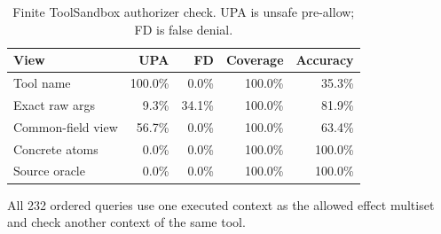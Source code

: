 \begin{table}[t]
\centering
\scriptsize
\setlength{\tabcolsep}{2.5pt}
\caption{Finite ToolSandbox authorizer check. UPA is unsafe pre-allow; FD is false denial.}
\label{tab:concrete-atom-authorizer}
\begin{tabular}{@{}lrrrr@{}}
\toprule
View & UPA & FD & Coverage & Accuracy \\
\midrule
Tool name & 100.0\% & 0.0\% & 100.0\% & 35.3\% \\
Exact raw args & 9.3\% & 34.1\% & 100.0\% & 81.9\% \\
Common-field view & 56.7\% & 0.0\% & 100.0\% & 63.4\% \\
Concrete atoms & 0.0\% & 0.0\% & 100.0\% & 100.0\% \\
Source oracle & 0.0\% & 0.0\% & 100.0\% & 100.0\% \\
\bottomrule
\end{tabular}
\vspace{2pt}\parbox{0.98\linewidth}{\footnotesize All 232 ordered queries use one executed context as the allowed effect multiset and check another context of the same tool.}
\end{table}
